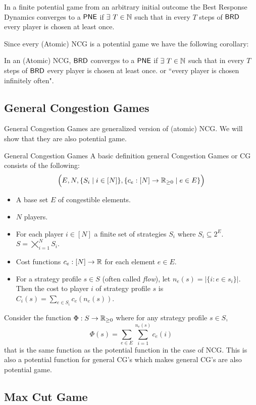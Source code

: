 \begin{Theorem}{}{}
	In a finite potential game from an arbitrary initial outcome the Best Response Dynamics converges to a $\operatorname{\mathsf{PNE}}$ if $\exists\ T\in\mathbb{N}$ such that in every $T$ steps of $\operatorname{\mathsf{BRD}}$ every player is chosen at least once.
\end{Theorem}

Since every (Atomic) NCG is a potential game we have the following corollary:
\begin{corolary}{}{}
	In an (Atomic) NCG, $\operatorname{\mathsf{BRD}}$ converges to a $\operatorname{\mathsf{PNE}}$ if $\exists\ T\in\mathbb{N}$ such that in every $T$ steps of $\operatorname{\mathsf{BRD}}$ every player is chosen at least once. or ``every player is chosen infinitely often".
\end{corolary}


\subsection{General Congestion Games}
General Congestion Games are generalized version of (atomic) NCG. We will show that they are also potential game.
\begin{definition}{General Congestion Games}{}
	A basic definition general Congestion Games or CG consists of the following: $$\Big(E,N, \{S_i\mid i\in[N]\}, \{c_e:[N]\to \mathbb{R}_{\geq 0}\mid e\in E\}\Big)$$
	\begin{itemize}[itemsep=-1mm]
		\item A base set $E$ of congestible elements.
		\item $N$ players.
		\item For each player $i\in[N]$ a finite set of strategies $S_i$ where $S_i\subseteq 2^E$. $S=\bigtimes\limits_{i=1}^N S_i$.
		\item Cost functions $c_e:[N]\to \mathbb{R}$ for each element $e\in E$.
		\item For a strategy profile $s\in S$ (often called \textit{flow}), let $n_e(s)=|\{i\colon e\in s_i\}|$. Then the cost to player $i$ of strategy profile $s$ is $C_i(s)=\sum\limits_{e\in S_i}c_e(n_e(s))$. 
	\end{itemize}
\end{definition}

 Consider the  function $\Phi:S\to \mathbb{R}_{\geq 0}$ where for any strategy profile $s\in S$, $$\Phi(s)=\sum\limits_{e\in E}\sum\limits_{i=1}^{n_e(s)}c_e(i)$$ that is the same function as the potential function in the case of NCG. This is also a potential function for general CG's which makes general CG's are also potential game.
\subsection{Max Cut Game}

